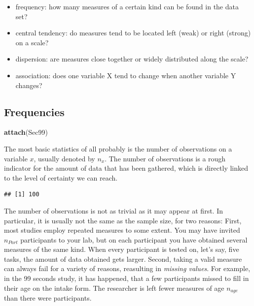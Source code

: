\documentclass[]{svmono}
\newenvironment{Shaded}{\begin{snugshade}}{\end{snugshade}}
\newcommand{\KeywordTok}[1]{\textcolor[rgb]{0.13,0.29,0.53}{\textbf{#1}}}
\newcommand{\OperatorTok}[1]{\textcolor[rgb]{0.81,0.36,0.00}{\textbf{#1}}}
\newcommand{\NormalTok}[1]{#1}
\providecommand{\tightlist}{%
  \setlength{\itemsep}{0pt}\setlength{\parskip}{0pt}}
\begin{document}
\begin{itemize}
\tightlist
\item
  frequency: how many measures of a certain kind can be found in the
  data set?
\item
  central tendency: do measures tend to be located left (weak) or right
  (strong) on a scale?
\item
  dispersion: are measures close together or widely distributed along
  the scale?
\item
  association: does one variable X tend to change when another variable
  Y changes?
\end{itemize}

\subsection{Frequencies}\label{frequencies}

\begin{Shaded}
\begin{Highlighting}[]
\KeywordTok{attach}\NormalTok{(Sec99)}
\end{Highlighting}
\end{Shaded}

The most basic statistics of all probably is the number of observations
on a variable \(x\), usually denoted by \(n_{x}\). The number of
observations is a rough indicator for the amount of data that has been
gathered, which is directly linked to the level of certainty we can
reach.

\begin{Shaded}
\end{Shaded}

\begin{verbatim}
## [1] 100
\end{verbatim}

The number of observations is not as trivial as it may appear at first.
In particular, it is usually not the same as the sample size, for two
reasons: First, most studies employ repeated measures to some extent.
You may have invited \(n_{Part}\) participants to your lab, but on each
participant you have obtained several measures of the same kind. When
every participant is tested on, let's say, five tasks, the amount of
data obtained gets larger. Second, taking a valid measure can always
fail for a variety of reasons, reasulting in \emph{missing values}. For
example, in the 99 seconds study, it has happened, that a few
participants missed to fill in their age on the intake form. The
researcher is left fewer measures of age \(n_{age}\) than there were
participants.
\end{document}
